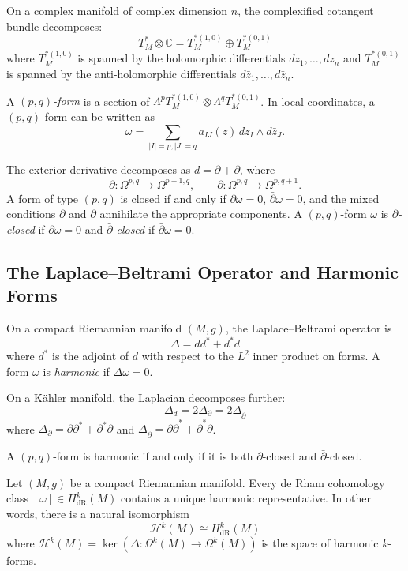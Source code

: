 On a complex manifold of complex dimension $n$, the complexified cotangent bundle decomposes:
\[
T^*_M \otimes \mathbb{C} = T^{*(1,0)}_M \oplus T^{*(0,1)}_M
\]
where $T^{*(1,0)}_M$ is spanned by the holomorphic differentials $dz_1, \ldots, dz_n$ and $T^{*(0,1)}_M$ is spanned by the anti-holomorphic differentials $d\bar{z}_1, \ldots, d\bar{z}_n$.

A \emph{$(p,q)$-form} is a section of $\Lambda^p T^{*(1,0)}_M \otimes \Lambda^q T^{*(0,1)}_M$. In local coordinates, a $(p,q)$-form can be written as
\[
\omega = \sum_{|I|=p, |J|=q} a_{IJ}(z)\, dz_I \wedge d\bar{z}_J.
\]

The exterior derivative decomposes as $d = \partial + \bar{\partial}$, where
\[
\partial: \Omega^{p,q} \to \Omega^{p+1,q}, \qquad \bar{\partial}: \Omega^{p,q} \to \Omega^{p,q+1}.
\]
A form of type $(p,q)$ is closed if and only if $\partial\omega = 0$, $\bar{\partial}\omega = 0$, and the mixed conditions $\partial$ and $\bar{\partial}$ annihilate the appropriate components. A $(p,q)$-form $\omega$ is \emph{$\partial$-closed} if $\partial\omega = 0$ and \emph{$\bar{\partial}$-closed} if $\bar{\partial}\omega = 0$.

\subsection{The Laplace--Beltrami Operator and Harmonic Forms}

On a compact Riemannian manifold $(M, g)$, the Laplace--Beltrami operator is
\[
\Delta = dd^* + d^*d
\]
where $d^*$ is the adjoint of $d$ with respect to the $L^2$ inner product on forms. A form $\omega$ is \emph{harmonic} if $\Delta\omega = 0$.

On a K\"{a}hler manifold, the Laplacian decomposes further:
\[
\Delta_d = 2\Delta_{\partial} = 2\Delta_{\bar{\partial}}
\]
where $\Delta_{\partial} = \partial\partial^* + \partial^*\partial$ and $\Delta_{\bar{\partial}} = \bar{\partial}\bar{\partial}^* + \bar{\partial}^*\bar{\partial}$.

A $(p,q)$-form is harmonic if and only if it is both $\partial$-closed and $\bar{\partial}$-closed.

\begin{theorem}[Hodge, 1941]
Let $(M, g)$ be a compact Riemannian manifold. Every de Rham cohomology class $[\omega] \in H^k_{\text{dR}}(M)$ contains a unique harmonic representative. In other words, there is a natural isomorphism
\[
\mathcal{H}^k(M) \cong H^k_{\text{dR}}(M)
\]
where $\mathcal{H}^k(M) = \ker(\Delta: \Omega^k(M) \to \Omega^k(M))$ is the space of harmonic $k$-forms.
\end{theorem}

